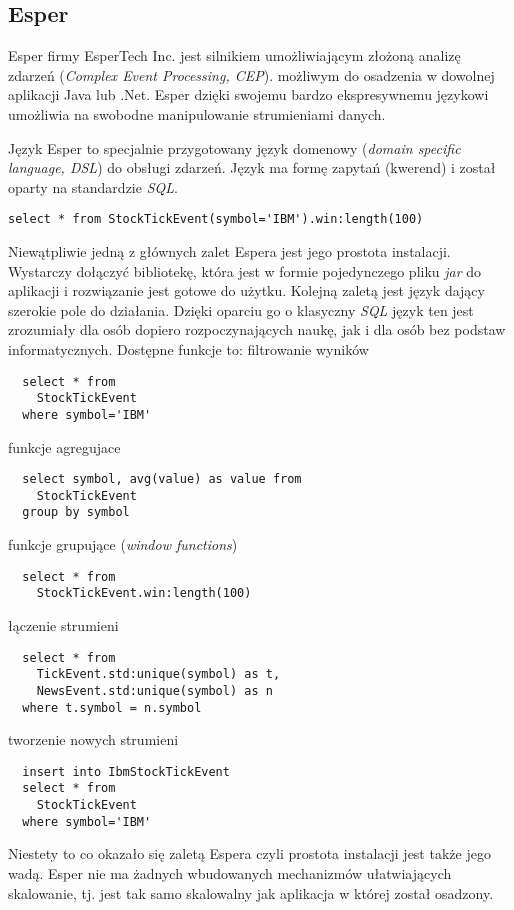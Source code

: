 \subsection{Esper}
Esper firmy EsperTech Inc. jest silnikiem umożliwiającym złożoną analizę zdarzeń
(\textit{Complex Event Processing, CEP}).
możliwym do osadzenia w dowolnej aplikacji Java lub .Net.
Esper dzięki swojemu bardzo ekspresywnemu językowi umożliwia na swobodne manipulowanie strumieniami danych.

Język Esper to specjalnie przygotowany język domenowy (\textit{domain specific language, DSL}) do obsługi zdarzeń.
Język ma formę zapytań (kwerend) i został oparty na standardzie \textit{SQL}.

\begin{lstlisting}[captionpos=b, caption=Przykładowe zapytanie w języku Esper]
  select * from StockTickEvent(symbol='IBM').win:length(100)
\end{lstlisting}

Niewątpliwie jedną z głównych zalet Espera jest jego prostota instalacji.
Wystarczy dołączyć bibliotekę,
która jest w formie pojedynczego pliku \textit{jar}
do aplikacji i rozwiązanie jest gotowe do użytku.
Kolejną zaletą jest język dający szerokie pole do działania.
Dzięki oparciu go o klasyczny \textit{SQL} język ten jest zrozumiały dla osób dopiero rozpoczynających naukę,
jak i dla osób bez podstaw informatycznych.
Dostępne funkcje to:
filtrowanie wyników
\begin{lstlisting}
  select * from
    StockTickEvent
  where symbol='IBM'
\end{lstlisting}
funkcje agregujace
\begin{lstlisting}
  select symbol, avg(value) as value from
    StockTickEvent
  group by symbol
\end{lstlisting}
funkcje grupujące (\textit{window functions})
\begin{lstlisting}
  select * from
    StockTickEvent.win:length(100)
\end{lstlisting}
łączenie strumieni
\begin{lstlisting}
  select * from
    TickEvent.std:unique(symbol) as t,
    NewsEvent.std:unique(symbol) as n
  where t.symbol = n.symbol
\end{lstlisting}
tworzenie nowych strumieni
\begin{lstlisting}
  insert into IbmStockTickEvent
  select * from
    StockTickEvent
  where symbol='IBM'
\end{lstlisting}

Niestety to co okazało się zaletą Espera czyli prostota instalacji
jest także jego wadą.
Esper nie ma żadnych wbudowanych mechanizmów ułatwiających skalowanie,
tj. jest tak samo skalowalny jak aplikacja w której został osadzony.
